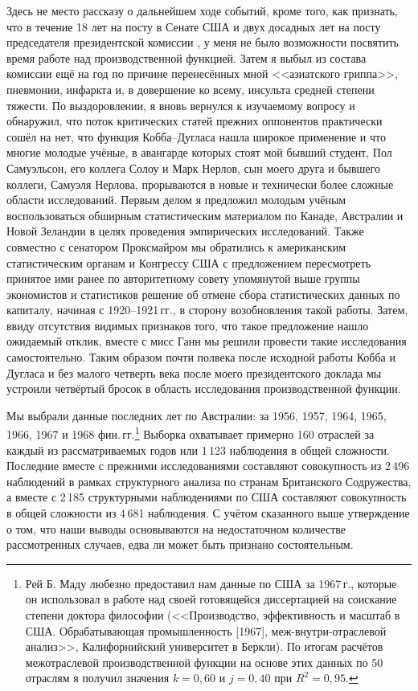 \documentclass{article}
\begin{document}
Здесь не место рассказу о дальнейшем ходе событий, кроме того, как признать, что в течение 18 лет на посту в Сенате США %
и двух досадных лет на посту председателя президентской комиссии%
, у меня не было возможности посвятить время работе над производственной функцией. Затем я выбыл из состава комиссии ещё на год по причине перенесённых мной <<азиатского гриппа>>, пневмонии, инфаркта и, в довершение ко всему, инсульта средней степени тяжести. По выздоровлении, я вновь вернулся к изучаемому вопросу и обнаружил, что поток критических статей прежних оппонентов практически сошёл на нет, что функция Кобба--Дугласа нашла широкое применение и что многие молодые учёные, в авангарде которых стоят мой бывший студент, Пол Самуэльсон, его коллега Солоу и Марк Нерлов, сын моего друга и бывшего коллеги, Самуэля Нерлова, прорываются в новые и технически более сложные области исследований. Первым делом я предложил молодым учёным воспользоваться обширным статистическим материалом по Канаде, Австралии и Новой Зеландии в целях проведения эмпирических исследований. Также совместно с сенатором Проксмайром мы обратились к американским статистическим органам и Конгрессу США с предложением пересмотреть принятое ими ранее по авторитетному совету упомянутой выше группы экономистов и статистиков решение об отмене сбора статистических данных по капиталу, начиная с 1920--1921\,гг., в сторону возобновления такой работы. Затем, ввиду отсутствия видимых признаков того, что такое предложение нашло ожидаемый отклик, вместе с мисс Ганн мы решили провести такие исследования самостоятельно. Таким образом почти полвека после исходной работы Кобба и Дугласа и без малого четверть века после моего президентского доклада мы устроили четвёртый бросок в область исследования производственной функции.

Мы выбрали данные последних лет по Австралии: за 1956, 1957, 1964, 1965, 1966, 1967 и 1968 фин.\,гг.\footnote{Рей Б. Маду любезно предоставил нам данные по США за 1967\,г., которые он использовал в работе над своей готовящейся диссертацией на соискание степени доктора философии (<<Производство, эффективность и масштаб в США. Обрабатывающая промышленность [1967], меж-внутри-отраслевой анализ>>, Калифорнийский университет в Беркли). По итогам расчётов межотраслевой производственной функции на основе этих данных по 50 отраслям я получил значения \(k = 0{,}60\) и \(j = 0{,}40\) при \(R^2=0{,}95\).} Выборка охватывает примерно 160 отраслей за каждый из рассматриваемых годов или 1\,123 наблюдения в общей сложности. Последние вместе с прежними исследованиями составляют совокупность из 2\,496 наблюдений в рамках структурного анализа по странам Британского Содружества, а вместе с 2\,185 структурными %
наблюдениями по США составляют совокупность в общей сложности из 4\,681 наблюдения. С учётом сказанного выше утверждение о том, что наши выводы основываются на недостаточном количестве рассмотренных случаев, едва ли может быть признано состоятельным.
\end{document}

